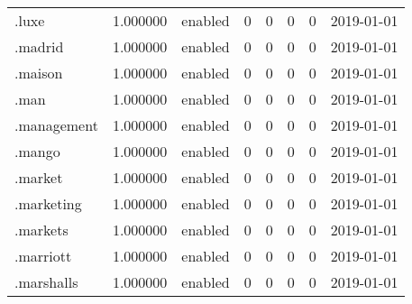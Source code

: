 \begin{tabular}{lrlrrrrl}
.luxe                     &          1.000000 &         enabled &                           0 &                           0 &                           0 &                   0 &           2019-01-01 \\
.madrid                   &          1.000000 &         enabled &                           0 &                           0 &                           0 &                   0 &           2019-01-01 \\
.maison                   &          1.000000 &         enabled &                           0 &                           0 &                           0 &                   0 &           2019-01-01 \\
.man                      &          1.000000 &         enabled &                           0 &                           0 &                           0 &                   0 &           2019-01-01 \\
.management               &          1.000000 &         enabled &                           0 &                           0 &                           0 &                   0 &           2019-01-01 \\
.mango                    &          1.000000 &         enabled &                           0 &                           0 &                           0 &                   0 &           2019-01-01 \\
.market                   &          1.000000 &         enabled &                           0 &                           0 &                           0 &                   0 &           2019-01-01 \\
.marketing                &          1.000000 &         enabled &                           0 &                           0 &                           0 &                   0 &           2019-01-01 \\
.markets                  &          1.000000 &         enabled &                           0 &                           0 &                           0 &                   0 &           2019-01-01 \\
.marriott                 &          1.000000 &         enabled &                           0 &                           0 &                           0 &                   0 &           2019-01-01 \\
.marshalls                &          1.000000 &         enabled &                           0 &                           0 &                           0 &                   0 &           2019-01-01 \\

\end{tabular}
